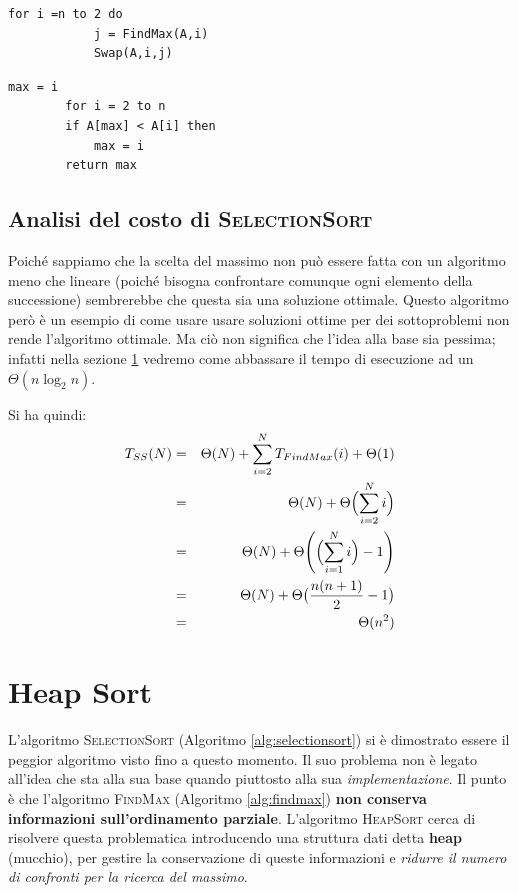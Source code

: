 \begin{minipage}{.4\textwidth}
	\begin{lstlisting}[caption={\textsc{SelectionSort}(A,n)},language=asd,label=alg:selectionsort]
		for i =n to 2 do
			j = FindMax(A,i)
			Swap(A,i,j)
	\end{lstlisting}
\end{minipage}
\begin{minipage}{.4\textwidth}
	\begin{lstlisting}[caption={\textsc{FindMax}(A,n)},language=asd,label=alg:findmax]
		max = i
		for i = 2 to n
		if A[max] < A[i] then
			max = i
		return max
	\end{lstlisting}
\end{minipage}

\subsection{Analisi del costo di \textsc{SelectionSort}}
Poiché sappiamo che la scelta del massimo non può essere fatta con un algoritmo meno che lineare (poiché bisogna confrontare comunque ogni elemento della successione) sembrerebbe che questa sia una soluzione ottimale. Questo algoritmo però è un esempio di come usare usare soluzioni ottime per dei sottoproblemi non rende l'algoritmo ottimale. Ma ciò non significa che l'idea alla base sia pessima; infatti nella sezione \ref{sez:HeapSort} vedremo come abbassare il tempo di esecuzione ad un $\Theta(n \log_{2}n)$.

Si ha quindi:
\begin{eqnarray}
	T_{SS}(N) &=& \Theta(N)+\sum_{i=2}^{N} T_{FindMax}(i)+ \Theta(1) \nonumber \\
	&=& \Theta(N)+ \Theta \Bigl(\sum_{i=2}^{N} i \Bigr) \nonumber \\
	&=& \Theta(N) + \Theta \Biggl( \Bigl(\sum_{i=1}^{N}i \Bigr) -1 \Biggr) \nonumber \\
	&=& \Theta(N) + \Theta \bigl(\frac{n(n+1)}{2} -1\bigr) \nonumber \\
	&=& \Theta(n^{2})
\end{eqnarray}

\section{Heap Sort}\label{sez:HeapSort}
L'algoritmo \textsc{SelectionSort} (Algoritmo \ref{alg:selectionsort}) si è dimostrato essere il peggior algoritmo visto fino a questo momento. Il suo problema non è legato all'idea che sta alla sua base quando piuttosto alla sua \textit{implementazione}. Il punto è che l'algoritmo \textsc{FindMax} (Algoritmo \ref{alg:findmax}) \textbf{non conserva informazioni sull'ordinamento parziale}. L'algoritmo \textsc{HeapSort} cerca di risolvere questa problematica introducendo una struttura dati detta \textbf{heap} (mucchio), per gestire la conservazione di queste informazioni e \textit{ridurre il numero di confronti per la ricerca del massimo}.

